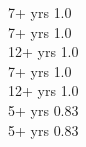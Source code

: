 
 {7+ yrs} {1.0} \\[-8pt]

 {7+ yrs} {1.0} \\[-8pt]

 {12+ yrs} {1.0} \\[-8pt]

 {7+ yrs} {1.0} \\[-8pt]

 {12+ yrs} {1.0} \\[-8pt]

 {5+ yrs} {0.83} \\[-8pt]

 {5+ yrs} {0.83} \\[-8pt]

